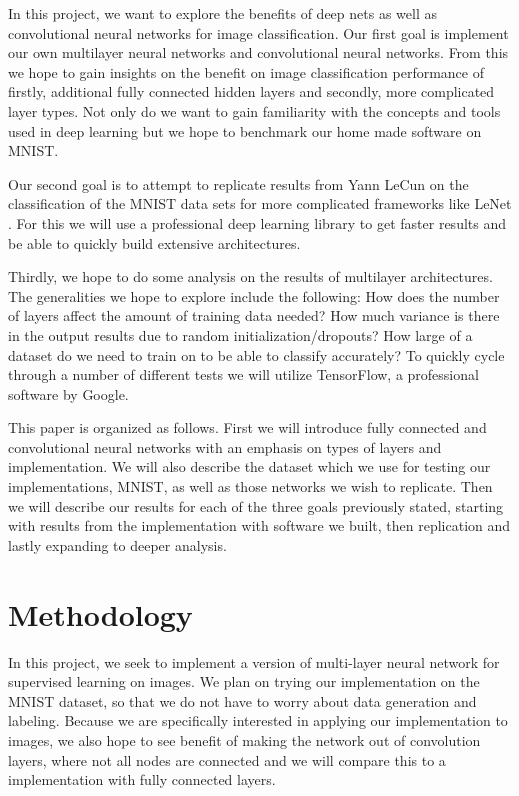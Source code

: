 \documentclass[12pt, twocolumn]{article}
\begin{document}
In this project, we want to explore the benefits of deep nets as well as convolutional neural networks for image classification.  Our first goal is implement our own multilayer neural networks and convolutional neural networks. From this we hope to gain insights on the benefit on image classification performance of firstly, additional fully connected hidden layers and secondly, more complicated layer types.  Not only do we want to gain familiarity with the concepts and tools used in deep learning but we hope to benchmark our home made software on MNIST. 

Our second goal is to attempt to replicate results from Yann LeCun on the classification of the MNIST data sets for more complicated frameworks like LeNet \cite{LeCun1998}. For this we will use a professional deep learning library to get faster results and be able to quickly build extensive architectures. 

Thirdly, we hope to do some analysis on the results of multilayer architectures. The generalities we hope to explore include the following: How does the number of layers affect the amount of training data needed?  How much variance is there in the output results due to random initialization/dropouts? How large of a dataset do we need to train on to be able to classify accurately?  To quickly cycle through a number of different tests we will utilize TensorFlow, a professional software by Google.

This paper is organized as follows. First we will introduce fully connected and convolutional neural networks with an emphasis on types of layers and implementation. We will also describe the dataset which we use for testing our implementations, MNIST, as well as those networks we wish to replicate.  Then we will describe our results for each of the three goals previously stated, starting with results from the implementation with software we built, then replication and lastly expanding to deeper analysis. 

\section{Methodology}
In this project, we seek to implement a version of multi-layer neural network for supervised learning on images. We plan on trying our implementation on the MNIST dataset, so that we do not have to worry about data generation and labeling. Because we are specifically interested in applying our implementation to images, we also hope to see benefit of making the network out of convolution layers, where not all nodes are connected and we will compare this to a implementation with fully connected layers.
\end{document}
